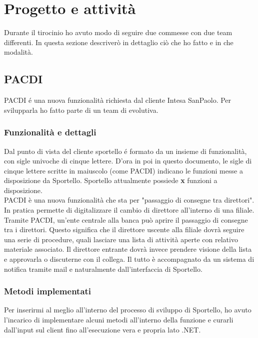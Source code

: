 \section{Progetto e attività}

Durante il tirocinio ho avuto modo di seguire due commesse con due team differenti. In questa sezione descriverò in dettaglio ciò che ho fatto e in che modalità.

\subsection{PACDI}

PACDI é una nuova funzionalità richiesta dal cliente Intesa SanPaolo. Per svilupparla ho fatto parte di un team di evolutiva. 

\subsubsection{Funzionalità e dettagli}
Dal punto di vista del cliente sportello é formato da un insieme di funzionalità, con sigle univoche di cinque lettere. D'ora in poi in questo documento, le sigle di cinque lettere scritte in maiuscolo (come PACDI) indicano le funzioni messe a disposizione da Sportello. 
Sportello attualmente possiede \textbf{x} funzioni a disposizione. \\
 
PACDI è una nuova funzionalità che sta per "passaggio di consegne tra direttori". In pratica permette di digitalizzare il cambio di direttore all'interno di una filiale. Tramite PACDI, un'ente centrale alla banca può aprire il passaggio di consegne tra i direttori. Questo significa che il direttore uscente alla filiale dovrà seguire una serie di procedure, quali lasciare una lista di attività aperte con relativo materiale associato. Il direttore entrante dovrà invece prendere visione della lista e approvarla o discuterne con il collega. Il tutto è accompagnato da un sistema di notifica tramite mail e naturalmente dall'interfaccia di Sportello. \\

\subsubsection{Metodi implementati}
Per inserirmi al meglio all'interno del processo di sviluppo di Sportello, ho avuto l'incarico di implementare alcuni metodi all'interno della funzione e curarli dall'input sul client fino all'esecuzione vera e propria lato .NET. \\ 


